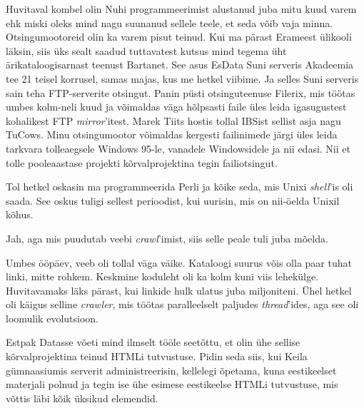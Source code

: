 Huvitaval kombel olin Nuhi programmeerimist alustanud juba mitu kuud 
varem ehk miski oleks mind nagu suunanud sellele teele, et seda võib vaja 
minna. Otsingumootoreid olin ka varem pisut teinud. Kui ma pärast 
Erameest ülikooli läksin, siis üks sealt saadud tuttavatest kutsus mind 
tegema üht ärikataloogisarnast teenust Bartanet. See 
asus EsData Suni serveris Akadeemia tee 21 
teisel korrusel, samas majas, kus me hetkel viibime. Ja selles Suni serveris 
sain teha FTP-serverite otsingut. Panin püsti otsinguteenuse Filerix, mis töötas umbes 
kolm-neli kuud ja võimaldas väga hõlpsasti 
faile üles leida igasugustest kohalikest FTP \emph{mirror}'itest. 
Marek Tiits hostis tollal IBSist 
sellist asja nagu TuCows. Minu otsingumootor 
võimaldas kergesti failinimede järgi üles leida tarkvara tolleaegsele Windows 
95-le, vanadele Windowsidele ja nii edasi. Nii et tolle pooleaastase projekti kõrvalprojektina tegin failiotsingut.


Tol hetkel oskasin ma programmeerida Perli ja kõike 
seda, mis Unixi \emph{shell}'is oli saada. See oskus tuligi sellest perioodist, 
kui uurisin, mis on nii-öelda Unixil kõhus.


Jah, aga mis puudutab veebi \emph{crawl}'imist, siis selle peale tuli juba 
mõelda.


Umbes ööpäev, veeb oli 
tollal väga väike. Kataloogi suurus võis olla paar tuhat linki, mitte rohkem. 
Keskmine koduleht oli ka kolm kuni viis lehekülge. Huvitavamaks läks pärast, kui linkide hulk ulatus juba 
miljoniteni. Ühel hetkel oli käigus selline \emph{crawler}, mis 
töötas paralleelselt paljudes \emph{thread}'ides, aga see oli 
loomulik evolutsioon. 

Estpak Datasse võeti mind ilmselt tööle seetõttu, et olin ühe sellise kõrvalprojektina 
teinud HTMLi tutvustuse. Pidin seda siis, kui Keila gümnaasiumis
serverit administreerisin, kellelegi õpetama, kuna 
eestikeelset materjali polnud ja tegin ise ühe esimese eestikeelse 
HTMLi tutvustuse, mis võttis läbi kõik üksikud elemendid.

